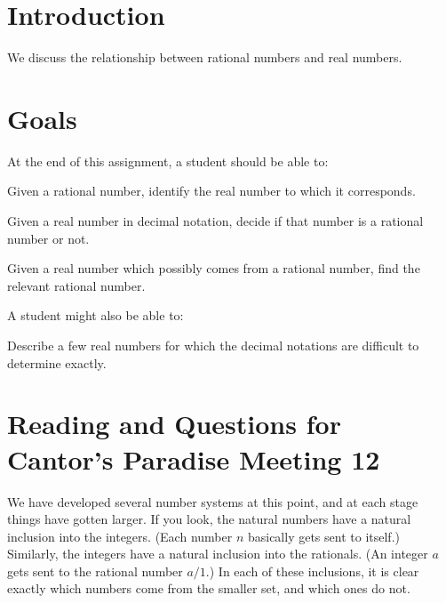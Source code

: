 \documentclass[12pt,letterpaper]{article}
\theoremstyle{definition}
\begin{document}
\setlength{\parskip}{1ex plus 0.5ex minus 0.2ex}
\setlength{\parindent}{0pt}

\pagestyle{fancy}
\cfoot{}

\section*{Introduction}
We discuss the relationship between rational numbers and real numbers.

\section*{Goals}
At the end of this assignment, a student should be able to:
\begin{compactitem}
\item Given a rational number, identify the real number to which it corresponds.
\item Given a real number in decimal notation, decide if that number is a rational number or not.
\item Given a real number which possibly comes from a rational number, find the relevant rational number.
\end{compactitem}
A student might also be able to:
\begin{compactitem}
\item Describe a few real numbers for which the decimal notations are difficult to determine exactly.
\end{compactitem}

\section*{Reading and Questions for Cantor's Paradise Meeting 12}

We have developed several number systems at this point, and at each stage things have gotten larger.
If you look, the natural numbers have a natural inclusion into the integers. 
(Each number $n$ basically gets sent to itself.)
Similarly, the integers have a natural inclusion into the rationals.
(An integer $a$ gets sent to the rational number $a/1$.)
In each of these inclusions, it is clear exactly which numbers come from the smaller set, and which ones do not.
\end{document}
